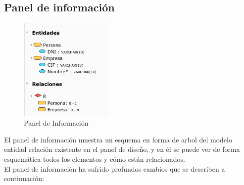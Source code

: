 \subsection{Panel de información}

\begin{figure}[H]
    \centering
    \includegraphics[width=0.4\textwidth]{img/PanelInfo.png}
    \caption{Panel de Información}
\end{figure}

El panel de información muestra un esquema en forma de arbol del modelo entidad relación existente en el panel de diseño, y en él se puede ver de forma esquemática todos los elementos y cómo están relacionados.\\

El panel de información ha sufrido profundos cambios que se describen a continuación:

